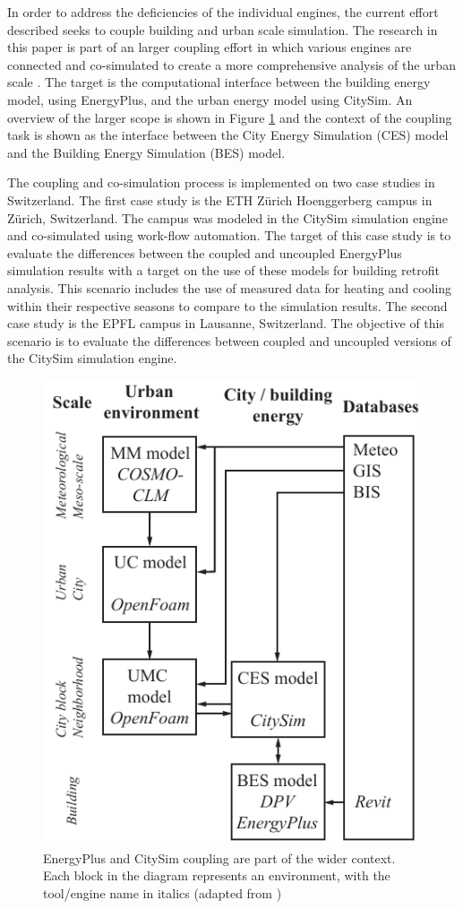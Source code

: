 \documentclass{tBPS2e}
\theoremstyle{plain}
\theoremstyle{definition}
\theoremstyle{remark}
\begin{document}
In order to address the deficiencies of the individual engines, the current effort described seeks to couple building and urban scale simulation. The research in this paper is part of an larger coupling effort in which various engines are connected and co-simulated to create a more comprehensive analysis of the urban scale \citep{Dorer:2013vt,Allegrini:2012kx}. The target is the computational interface between the building energy model, using EnergyPlus, and the urban energy model using CitySim. An overview of the larger scope is shown in Figure \ref{fig:UMEM} and the context of the coupling task is shown as the interface between the City Energy Simulation (CES) model and the Building Energy Simulation (BES) model.

The coupling and co-simulation process is implemented on two case studies in Switzerland. The first case study is the ETH Z\"urich Hoenggerberg campus in Z\"urich, Switzerland. The campus was modeled in the CitySim simulation engine and co-simulated using work-flow automation. The target of this case study is to evaluate the differences between the coupled and uncoupled EnergyPlus simulation results with a target on the use of these models for building retrofit analysis. This scenario includes the use of measured data for heating and cooling within their respective seasons to compare to the simulation results. The second case study is the EPFL campus in Lausanne, Switzerland. The objective of this scenario is to evaluate the differences between coupled and uncoupled versions of the CitySim simulation engine. 

\begin{figure}
\centering
\includegraphics[scale=0.7]{figures/UMEM_overview_new}
\caption{EnergyPlus and CitySim coupling are part of the wider context. Each block in the diagram represents an environment, with the tool/engine name in italics (adapted from \citep{Dorer:2013vt})}
\label{fig:UMEM}
\end{figure}
\end{document}
